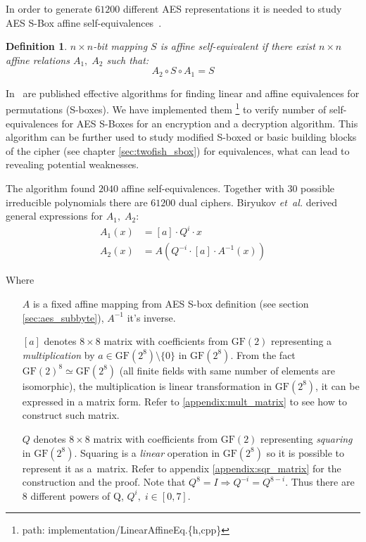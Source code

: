 \documentclass[11pt,oneside,final]{fithesis2}
\newtheorem{mydef}{Definition}
\newcommand{\gfe}{\ensuremath{\text{GF}\left(2^8\right)}}
\newcommand{\gf}{\ensuremath{\text{GF}\left(2\right)}}
\begin{document}
	In order to generate $61200$ different AES representations it is needed to study AES S-Box affine self-equivalences~\citep{Biryukov:2003:TCL:1766171.1766175}. 
		
	\begin{mydef}
	$n \times n$-bit mapping $S$ is affine self-equivalent if there exist $n \times n$ affine relations $A_1,\;A_2$ such that: 
	\begin{equation}\label{eq:selfeq}
	A_2 \circ S \circ A_1 = S 
	\end{equation}
	\end{mydef}
	
	In~\citep{Biryukov:2003:TCL:1766171.1766175} are published effective algorithms for finding linear and affine equivalences for permutations (S-boxes). We have implemented
	them \footnote{path: implementation/LinearAffineEq.\{h,cpp\}} to verify number of self-equivalences for AES S-Boxes for an encryption and a decryption algorithm. 
	This algorithm can be further used to study modified S-boxed or basic building blocks of the cipher (see chapter \ref{sec:twofish_sbox}) for equivalences, what can lead
	to revealing potential weaknesses.
	
	The algorithm found $2040$ affine self-equivalences. Together with $30$ possible irreducible polynomials there are $61200$ dual ciphers.
	Biryukov \emph{et~al.} derived general expressions for $A_1,\;A_2$:
	\begin{subequations}
	\begin{align}
	    A_1(x) &= \left[a\right] \cdot Q^i \cdot x\\
	    A_2(x) &= A\left( Q^{-i} \cdot \left[a\right] \cdot A^{-1}\left(x\right) \right)
	\end{align}
	\end{subequations}
	
	Where
	\begin{itemize}[leftmargin=5em]
	 \item[{$A$}] is a fixed affine mapping from AES S-box definition (see section \ref{sec:aes_subbyte}), $A^{-1}$ it's inverse.
	 \item[{$[a]$}] denotes $8 \times 8$ matrix with coefficients from $\gf$ representing a \emph{multiplication} by $a \in \gfe \setminus \{0\}$ in $\gfe$. 
	    From the fact $\gf^8 \simeq \gfe$ (all finite fields with same number of elements are isomorphic), the multiplication is
	    linear transformation in $\gfe$, it can be expressed in a matrix form. Refer to \ref{appendix:mult_matrix} to see how to construct such matrix.
	 \item[{$Q$}] denotes $8 \times 8$ matrix with coefficients from $\gf$ representing \emph{squaring} in $\gfe$. Squaring is a \emph{linear} operation
	    in $\gfe$ so it is possible to represent it as a~matrix. Refer to appendix \ref{appendix:sqr_matrix} for the construction and the proof. Note that 
	    $Q^8 = I \Rightarrow Q^{-i} = Q^{8-i}$. Thus there are 8 different powers of Q, $Q^{i}, \; i \in [0,7]$.
	\end{itemize}
	
\end{document}
